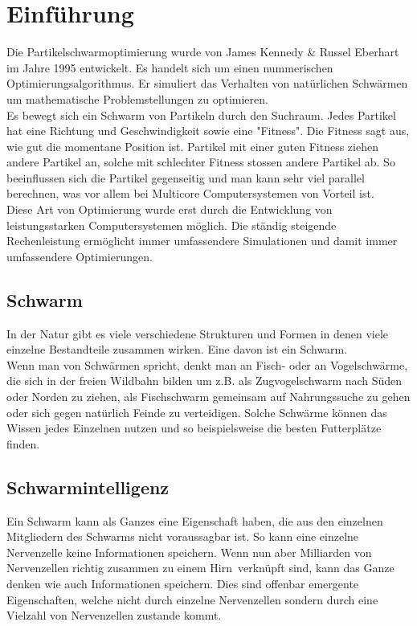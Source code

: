 \section{Einführung}
		Die Partikelschwarmoptimierung wurde von James Kennedy \& Russel Eberhart im Jahre 1995 entwickelt. Es handelt sich um einen nummerischen Optimierungsalgorithmus. Er simuliert das Verhalten von natürlichen Schwärmen um mathematische Problemstellungen zu optimieren.\\
		Es bewegt sich ein Schwarm von Partikeln durch den Suchraum. Jedes Partikel hat eine Richtung und Geschwindigkeit sowie eine "Fitness". Die Fitness sagt aus, wie gut die momentane Position ist. Partikel mit einer guten Fitness ziehen andere Partikel an, solche mit schlechter Fitness stossen andere Partikel ab. So beeinflussen sich die Partikel gegenseitig und man kann sehr viel parallel berechnen, was vor allem bei Multicore Computersystemen von Vorteil ist. \\
		Diese Art von Optimierung wurde erst durch die Entwicklung von leistungsstarken Computersystemen möglich. Die ständig steigende Rechenleistung ermöglicht immer umfassendere Simulationen und damit immer umfassendere Optimierungen.
		\subsection{Schwarm}
		In der Natur gibt es viele verschiedene Strukturen und Formen in denen viele einzelne Bestandteile zusammen wirken. Eine davon ist ein Schwarm.\\
		Wenn man von Schwärmen spricht, denkt man an Fisch- oder an Vogelschwärme, die sich in der freien Wildbahn  bilden um z.B. als Zugvogelschwarm nach Süden oder Norden zu ziehen, als Fischschwarm gemeinsam auf Nahrungssuche zu gehen oder sich gegen natürlich Feinde zu verteidigen. Solche Schwärme können das Wissen jedes Einzelnen nutzen und so beispielsweise die besten Futterplätze finden.
		\subsection{Schwarmintelligenz}
		Ein Schwarm kann als Ganzes eine Eigenschaft haben, die aus den einzelnen Mitgliedern des Schwarms nicht voraussagbar ist. So kann eine einzelne Nervenzelle keine Informationen speichern. Wenn nun aber Milliarden von Nervenzellen richtig zusammen zu einem \textacutedbl Hirn\textacutedbl \ verknüpft sind, kann das Ganze denken wie auch Informationen speichern. Dies sind offenbar emergente Eigenschaften, welche nicht durch einzelne Nervenzellen sondern durch eine Vielzahl von Nervenzellen zustande kommt.
		\cite{partice-swarm-optimization}
